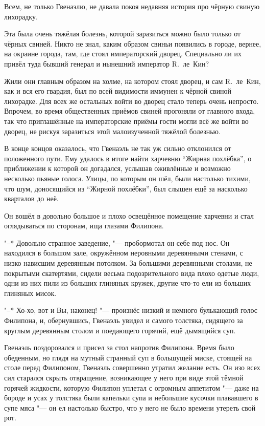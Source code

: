 Всем, не только Гвенаэлю, не давала покоя недавняя история про чёрную свиную
лихорадку.

Эта была очень тяжёлая болезнь, которой заразиться можно было только от чёрных
свиней.
Никто не знал, каким образом свиньи появились в городе, вернее, на окраине
города, там, где стоял императорский дворец.
Специально ли их привёл туда бывший генерал и нынешний император R.~ле~Кин?

Жили они главным образом на холме, на котором стоял дворец, и сам R.~ле~Кин, как
и вся его гвардия, был по всей видимости иммунен к чёрной свиной лихорадке.
Для всех же остальных войти во дворец стало теперь очень непросто.
Впрочем, во время общественных приёмов свиней прогоняли от главного входа, так
что приглашённые на императорские приёмы гости могли всё же войти во дворец, не
рискуя заразиться этой малоизученной тяжёлой болезнью.

В конце концов оказалось, что Гвенаэль не так уж сильно отклонился от
положенного пути.
Ему удалось в итоге найти харчевню \enquote{Жирная похлёбка}, о приближении к
которой он догадался, услышав оживлённые и возможно несколько пьяные голоса.
Улицы, по которым он шёл, были настолько тихими, что шум, доносящийся из
\enquote{Жирной похлёбки}, был слышен ещё за насколько кварталов до неё.

Он вошёл в довольно большое и плохо освещённое помещение харчевни и стал
оглядываться по сторонам, ища глазами Филипона.

"--* Довольно странное заведение, "--- пробормотал он себе под нос.
Он находился в большом зале, окружённом неровными деревянными стенами, с низко
нависшим деревянным потолком.
За большими деревянными столами, не покрытыми скатертями, сидели весьма
подозрительного вида плохо одетые люди, одни из них пили из больших глиняных
кружек, другие что-то ели из больших глиняных мисок.

"--* Хо-хо, вот и Вы, наконец! "--- произнёс низкий и немного булькающий голос
Филипона, и, обернувшись, Гвенаэль увидел и самого толстяка, сидящего за круглым
деревянным столом и поедающего горячий, ещё дымящийся суп.

Гвенаэль поздоровался и присел за стол напротив Филипона.
Время было обеденным, но глядя на мутный странный суп в большущей миске, стоящей
на столе перед Филипоном, Гвенаэль совершенно утратил желание есть.
Он изо всех сил старался скрыть отвращение, возникающее у него при виде этой
тёмной горячей жидкости, которую Филипон уплетал с огромным аппетитом "--- даже
на бороде и усах у толстяка были капельки супа и небольшие кусочки плававшего в
супе мяса "--- он ел настолько быстро, что у него не было времени утереть свой
рот.

